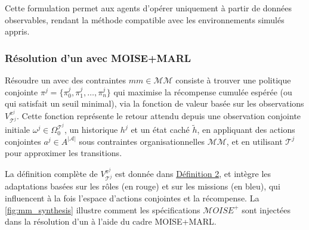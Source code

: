 \noindent Cette formulation permet aux agents  d'opérer uniquement à partir de données observables, rendant la méthode compatible avec les environnements simulés appris.

\subsubsection*{Résolution d'un  avec MOISE+MARL}

Résoudre un  avec des contraintes $mm \in \mathcal{MM}$ consiste à trouver une politique conjointe $\pi^j = \{\pi^j_0, \pi^j_1, \dots, \pi^j_n\}$ qui maximise la récompense cumulée espérée (ou qui satisfait un seuil minimal), via la fonction de valeur basée sur les observations $V_{\mathcal{T}^j}^{\pi^j}$. Cette fonction représente le retour attendu depuis une observation conjointe initiale $\omega^j \in \Omega^{\mathcal{T}^j}_0$, un historique $h^j$ et un état caché $\tilde{h}$, en appliquant des actions conjointes $a^j \in A^{|\mathcal{A}|}$ sous contraintes organisationnelles $\mathcal{MM}$, et en utilisant $\mathcal{T}^j$ pour approximer les transitions.

La définition complète de $V_{\mathcal{T}^j}^{\pi^j}$ est donnée dans \hyperref[eq:single_value_function_parallel]{Définition 2}, et intègre les adaptations basées sur les rôles (en rouge) et sur les missions (en bleu), qui influencent à la fois l'espace d'actions conjointes et la récompense. La \autoref{fig:mm_synthesis} illustre comment les spécifications $\mathcal{M}OISE^+$ sont injectées dans la résolution d'un  à l'aide du cadre MOISE+MARL.

\medskip

